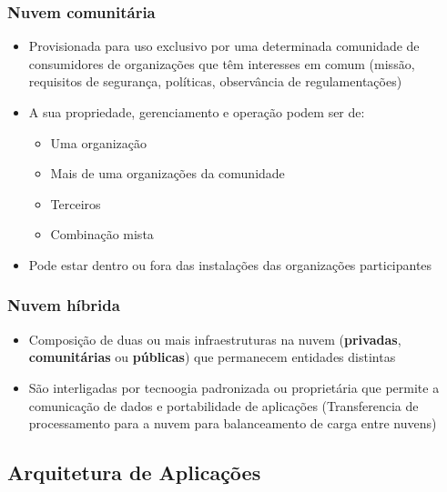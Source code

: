 \begin{frame}
	\frametitle{Nuvem comunitária}
	\begin{itemize}
		\item Provisionada para uso exclusivo por uma determinada comunidade de consumidores de organizações que têm interesses em comum (missão, requisitos de segurança, políticas, observância de regulamentações)
		\item A sua propriedade, gerenciamento e operação podem ser de:
			\begin{itemize}
				\item Uma organização
				\item Mais de uma organizações da comunidade
				\item Terceiros
				\item Combinação mista
			\end{itemize}
		\item Pode estar dentro ou fora das instalações das organizações participantes
	\end{itemize}
\end{frame}

\begin{frame}
	\frametitle{Nuvem híbrida}
	\begin{itemize}
		\item Composição de duas ou mais infraestruturas na nuvem (\textbf{privadas}, \textbf{comunitárias} ou \textbf{públicas}) que permanecem entidades distintas
		\item São interligadas por tecnoogia padronizada ou proprietária que permite a comunicação de dados e portabilidade de aplicações (Transferencia de processamento para a nuvem para balanceamento de carga entre nuvens)
	\end{itemize}
\end{frame}

\subsection{Arquitetura de Aplicações}

